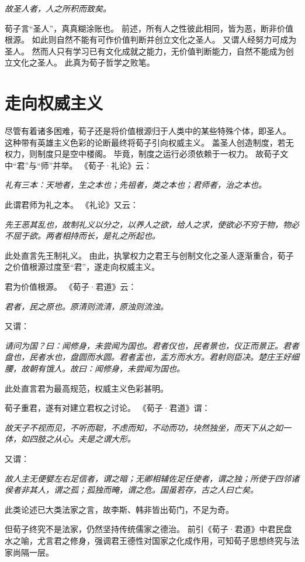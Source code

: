 \documentclass[11pt]{article}
\begin{document}
\textit{故圣人者，人之所积而致矣。}

荀子言“圣人”，真真糊涂账也。
前述，所有人之性彼此相同，皆为恶，断非价值根源。
如此则自然不能有可作价值判断并创立文化之圣人。
又谓人经努力可成为圣人。
然而人只有学习已有文化成就之能力，无价值判断能力，自然不能成为创立文化之圣人。
此真为荀子哲学之败笔。

\section{走向权威主义}
尽管有着诸多困难，荀子还是将价值根源归于人类中的某些特殊个体，即圣人。
这种带有英雄主义色彩的论断最终将荀子引向权威主义。
盖圣人创造制度，若无权力，则制度只是空中楼阁。
毕竟，制度之运行必须依赖于一权力。
故荀子文中“君”与“师”并举。
《荀子·礼论》云：

\textit{礼有三本：天地者，生之本也；先祖者，类之本也；君师者，治之本也。}

此谓君师为礼之本。
《礼论》又云：

\textit{先王恶其乱也，故制礼义以分之，以养人之欲，给人之求，使欲必不穷于物，物必不屈于欲。两者相持而长，是礼之所起也。}

此处直言先王制礼义。
由此，执掌权力之君王与创制文化之圣人逐渐重合，荀子之价值根源过度至“君”，遂走向权威主义。

\par

君为价值根源。
《荀子·君道》云：

\textit{君者，民之原也。原清则流清，原浊则流浊。}

又谓：

\textit{请问为国？曰：闻修身，未尝闻为国也。君者仪也，民者景也，仪正而景正。君者盘也，民者水也，盘圆而水圆。君者盂也，盂方而水方。君射则臣决。楚庄王好细腰，故朝有饿人。故曰：闻修身，未尝闻为国也。}

此处直言君为最高规范，权威主义色彩甚明。

\par

荀子重君，遂有对建立君权之讨论。
《荀子·君道》谓：

\textit{故天子不视而见，不听而聪，不虑而知，不动而功，块然独坐，而天下从之如一体，如四肢之从心。夫是之谓大形。}

又谓：

\textit{故人主无便嬖左右足信者，谓之暗；无卿相辅佐足任使者，谓之独；所使于四邻诸侯者非其人，谓之孤；孤独而晻，谓之危。国虽若存，古之人曰亡矣。}

此类论述已大类法家之言，故李斯、韩非皆出荀门，不足为奇。

\par

但荀子终究不是法家，仍然坚持传统儒家之德治。
前引《荀子·君道》中君民盘水之喻，尤言君之修身，强调君王德性对国家之化成作用，可知荀子思想终究与法家尚隔一层。
\end{document}
